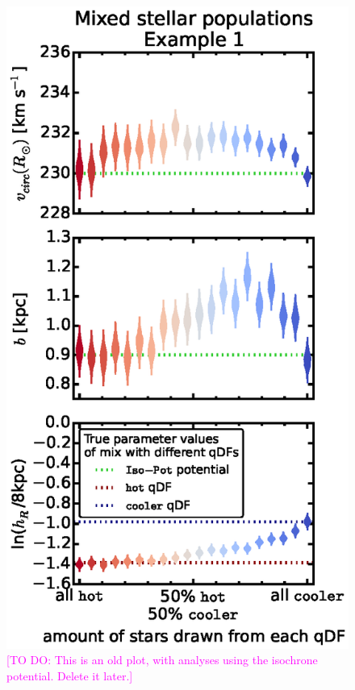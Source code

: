 \documentclass[iop,revtex4]{emulateapj}
\newcommand{\Wilma}[1]{\textcolor{Magenta}{#1}}
\begin{document}
\begin{figure}[!htbp]
\centering
\includegraphics[scale=0.55]{figs/isoSphFlexMixCont_violins_2.eps}
\caption{\Wilma{[TO DO: This is an old plot, with analyses using the isochrone potential. Delete it later.]}}
\end{figure}
\end{document}
